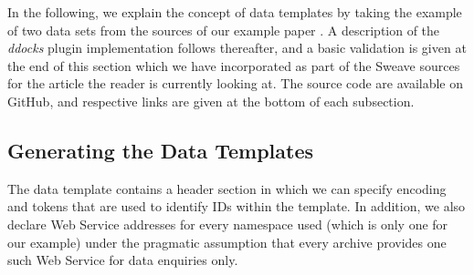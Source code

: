 \documentclass{acm_proc_article-sp}
\begin{document}
In the following, we explain the concept of data templates by taking the example of two data sets from the sources of our example paper \cite{KoenkerZeileis2009}. 
A description of the \textit{ddocks} plugin implementation follows thereafter,
and a basic validation is given at the end of this section which we have incorporated as part of the Sweave sources for the article the reader is currently looking at.
The source code are available on GitHub, and respective links are given at the bottom of each subsection.



\subsection{Generating the Data Templates}

The data template contains a header section in which we can specify encoding and tokens that are used to identify IDs within the template.
In addition, we also declare Web Service addresses for every namespace used (which is only one for our example) under the pragmatic assumption that every archive provides one such Web Service for data enquiries only.
\end{document}
